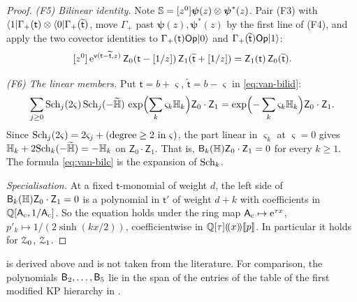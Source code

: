 \begin{proof}
\emph{(F5) Bilinear identity.} Note $\mathbb{S}=[z^0]\boldsymbol{\psi}(z)\otimes\boldsymbol{\psi}^*(z)$. Pair (F3) with $\langle 1\rvert\Gamma_+(\mathsf{t})\otimes\langle 0\rvert\Gamma_+(\widetilde{\mathsf{t}})$, move $\Gamma_+$ past $\boldsymbol{\psi}(z),\boldsymbol{\psi}^*(z)$ by the first line of (F4), and apply the two covector identities to $\Gamma_+(\mathsf{t})\mathsf{Op}\lvert 0\rangle$ and $\Gamma_+(\widetilde{\mathsf{t}})\mathsf{Op}\lvert 1\rangle$:
\begin{equation}\label{eq:van-bilid}
[z^0]\,\mathrm{e}^{\mathsf{v}(\mathsf{t}-\widetilde{\mathsf{t}},z)}\,\mathsf{Z}_0(\mathsf{t}-[1/z])\,\mathsf{Z}_1(\widetilde{\mathsf{t}}+[1/z])=\mathsf{Z}_1(\mathsf{t})\,\mathsf{Z}_0(\widetilde{\mathsf{t}}).
\end{equation}

\emph{(F6) The linear members.} Put $\mathsf{t}=b+\varsigma$, $\widetilde{\mathsf{t}}=b-\varsigma$ in \eqref{eq:van-bilid}:
\[
\sum_{j\geq 0}\mathrm{Sch}_j(2\varsigma)\,\mathrm{Sch}_j(-\widetilde{\mathbb{H}})\,\exp\Bigl(\sum_k\varsigma_k\mathbb{H}_k\Bigr)\mathsf{Z}_0\cdot\mathsf{Z}_1=\exp\Bigl(-\sum_k\varsigma_k\mathbb{H}_k\Bigr)\mathsf{Z}_0\cdot\mathsf{Z}_1.
\]
Since $\mathrm{Sch}_j(2\varsigma)=2\varsigma_j+(\text{degree}\geq 2\text{ in }\varsigma)$, the part linear in $\varsigma_k$ at $\varsigma=0$ gives $\mathbb{H}_k+2\mathrm{Sch}_k(-\widetilde{\mathbb{H}})=-\mathbb{H}_k$ on $\mathsf{Z}_0\cdot\mathsf{Z}_1$. That is, $\mathsf{B}_k(\mathbb{H})\mathsf{Z}_0\cdot\mathsf{Z}_1=0$ for every $k\geq 1$. The formula \eqref{eq:van-bilc} is the expansion of $\mathrm{Sch}_k$.

\emph{Specialisation.} At a fixed $\mathsf{t}$-monomial of weight $d$, the left side of $\mathsf{B}_k(\mathbb{H})\mathsf{Z}_0\cdot\mathsf{Z}_1=0$ is a polynomial in $\mathsf{t}'$ of weight $d+k$ with coefficients in $\mathbb{Q}[\mathsf{A}_{\mathrm{c}},1/\mathsf{A}_{\mathrm{c}}]$. So the equation holds under the ring map $\mathsf{A}_{\mathrm{c}}\mapsto\mathrm{e}^{\tau x}$, $p'_k\mapsto 1/(2\sinh(kx/2))$, coefficientwise in $\mathbb{Q}[\tau](\!(x)\!)[\![ p ]\!]$. In particular it holds for $\mathcal{Z}_0$, $\mathcal{Z}_1$.
\end{proof}

\begin{rmk}
 is derived above and is not taken from the literature. For comparison, the polynomials $\mathsf{B}_2,\dots,\mathsf{B}_5$ lie in the span of the entries of the table of the first modified KP hierarchy in \cite[Appendix~1, p.~996]{JM83}.
\end{rmk}

